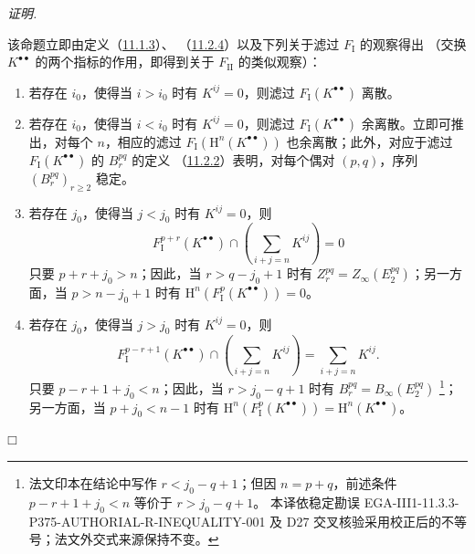\documentclass[UTF8,fontset=none,11pt,oneside,openany]{ctexbook}
\providecommand{\square}{\mdlgwhtsquare}
\newcommand{\SourceCorrectionNote}[1]{\footnote{#1}}
\newenvironment{proof}{%
  \par\smallskip\noindent\textit{证明.}\ %
}{\hfill$\square$\par}
\newcommand{\oldpage}[2][]{%
  \hypertarget{ega-source-page-#1-#2}{}%
  \marginnote{\scriptsize\textbf{#1}~|~#2}\ignorespaces}
\begin{document}
\begin{proof}
该命题立即由定义（\hyperref[0.11.1.3-fr]{11.1.3}）、
（\hyperref[0.11.2.4-fr]{11.2.4}）以及下列关于滤过 $F_{\mathrm I}$ 的观察得出
（交换 $K^{\bullet\bullet}$ 的两个指标的作用，即得到关于 $F_{\mathrm{II}}$ 的类似观察）：
\begin{enumerate}
  \item[$1^\circ$] 若存在 $i_0$，使得当 $i>i_0$ 时有 $K^{ij}=0$，则滤过
    $F_{\mathrm I}(K^{\bullet\bullet})$ 离散。
  \item[$2^\circ$] 若存在 $i_0$，使得当 $i<i_0$ 时有 $K^{ij}=0$，则滤过
    $F_{\mathrm I}(K^{\bullet\bullet})$ 余离散。立即可推出，对每个 $n$，相应的滤过
    $F_{\mathrm I}(\mathrm H^n(K^{\bullet\bullet}))$ 也余离散；此外，对应于滤过
    $F_{\mathrm I}(K^{\bullet\bullet})$ 的 $B_r^{pq}$ 的定义
    （\hyperref[0.11.2.2-fr]{11.2.2}）表明，对每个偶对 $(p,q)$，序列
    $(B_r^{pq})_{r\geq2}$ 稳定。
  \item[$3^\circ$] 若存在 $j_0$，使得当 $j<j_0$ 时有 $K^{ij}=0$，则
    \[
      F_{\mathrm I}^{p+r}(K^{\bullet\bullet})
      \cap\left(\sum_{i+j=n}K^{ij}\right)=0
    \]
    只要 $p+r+j_0>n$；因此，当 $r>q-j_0+1$ 时有
    $Z_r^{pq}=Z_\infty(E_2^{pq})$；另一方面，当 $p>n-j_0+1$ 时有
    $\mathrm H^n(F_{\mathrm I}^p(K^{\bullet\bullet}))=0$。
  \item[$4^\circ$] 若存在 $j_0$，使得当 $j>j_0$ 时有 $K^{ij}=0$，则
    \[
      F_{\mathrm I}^{p-r+1}(K^{\bullet\bullet})
      \cap\left(\sum_{i+j=n}K^{ij}\right)=\sum_{i+j=n}K^{ij}.
    \]
    \oldpage[0\textsubscript{III}]{31}
    只要 $p-r+1+j_0<n$；因此，当 $r>j_0-q+1$ 时有
    $B_r^{pq}=B_\infty(E_2^{pq})$
    \SourceCorrectionNote{法文印本在结论中写作 $r<j_0-q+1$；但因
    $n=p+q$，前述条件 $p-r+1+j_0<n$ 等价于 $r>j_0-q+1$。
    本译依稳定勘误 EGA-III1-11.3.3-P375-AUTHORIAL-R-INEQUALITY-001
    及 D27 交叉核验采用校正后的不等号；法文外交式来源保持不变。}；另一方面，当 $p+j_0<n-1$ 时有
    $\mathrm H^n(F_{\mathrm I}^p(K^{\bullet\bullet}))
    =\mathrm H^n(K^{\bullet\bullet})$。
\end{enumerate}
\end{proof}
\end{document}
